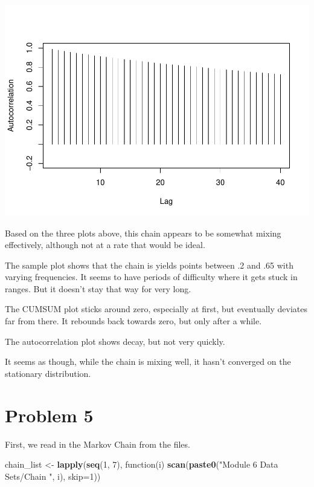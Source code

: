 \documentclass[]{article}
\newenvironment{Shaded}{\begin{snugshade}}{\end{snugshade}}
\newcommand{\KeywordTok}[1]{\textcolor[rgb]{0.13,0.29,0.53}{\textbf{{#1}}}}
\newcommand{\DataTypeTok}[1]{\textcolor[rgb]{0.13,0.29,0.53}{{#1}}}
\newcommand{\DecValTok}[1]{\textcolor[rgb]{0.00,0.00,0.81}{{#1}}}
\newcommand{\StringTok}[1]{\textcolor[rgb]{0.31,0.60,0.02}{{#1}}}
\newcommand{\NormalTok}[1]{{#1}}
\begin{document}
\includegraphics{Atlas-PS_6_files/figure-latex/unnamed-chunk-10-1.pdf}

Based on the three plots above, this chain appears to be somewhat mixing
effectively, although not at a rate that would be ideal.

The sample plot shows that the chain is yields points between .2 and .65
with varying frequencies. It seems to have periods of difficulty where
it gets stuck in ranges. But it doesn't stay that way for very long.

The CUMSUM plot sticks around zero, especially at first, but eventually
deviates far from there. It rebounds back towards zero, but only after a
while.

The autocorrelation plot shows decay, but not very quickly.

It seems as though, while the chain is mixing well, it hasn't converged
on the stationary distribution.

\section{Problem 5}\label{problem-5}

First, we read in the Markov Chain from the files.

\begin{Shaded}
\begin{Highlighting}[]
\NormalTok{chain_list <-}\StringTok{ }\KeywordTok{lapply}\NormalTok{(}\KeywordTok{seq}\NormalTok{(}\DecValTok{1}\NormalTok{, }\DecValTok{7}\NormalTok{), function(i) }\KeywordTok{scan}\NormalTok{(}\KeywordTok{paste0}\NormalTok{(}\StringTok{"Module 6 Data Sets/Chain "}\NormalTok{, i), }\DataTypeTok{skip=}\DecValTok{1}\NormalTok{))}
\end{Highlighting}
\end{Shaded}
\end{document}
